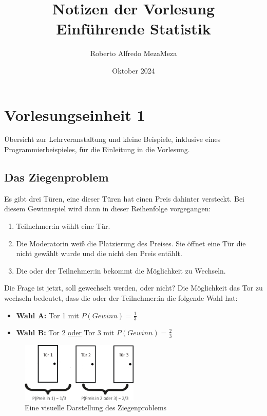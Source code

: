 \documentclass[12pt, a4paper]{article}
\title{Notizen der Vorlesung\\Einführende Statistik}
\author{Roberto Alfredo MezaMeza }
\date{Oktober 2024}
\begin{document}
\sloppy

\maketitle
\newpage

\section{Vorlesungseinheit 1}
    Übersicht zur Lehrveranstaltung und kleine Beispiele, inklusive eines Programmierbeispieles, für die Einleitung
    in die Vorlesung.

    \subsection{Das Ziegenproblem}
        Es gibt drei Türen, eine dieser Türen hat einen Preis dahinter versteckt. Bei diesem Gewinnspiel
        wird dann in dieser Reihenfolge vorgegangen:

        \begin{enumerate}
            \item Teilnehmer:in wählt eine Tür.
            \item Die Moderatorin weiß die Platzierung des Preises. Sie öffnet eine Tür die nicht gewählt wurde und die nicht den Preis entählt.
            \item Die oder der Teilnehmer:in bekommt die Möglichkeit zu Wechseln.
        \end{enumerate}

        Die Frage ist jetzt, soll gewechselt werden, oder nicht? Die Möglichkeit das Tor zu wechseln bedeutet, dass
        die oder der Teilnehmer:in die folgende Wahl hat:

        \begin{itemize}
            \item \textbf{Wahl A:} Tor 1 mit $P(Gewinn)=\frac{1}{3}$
            \item \textbf{Wahl B:} Tor 2 \underline{oder} Tor 3 mit $P(Gewinn)=\frac{2}{3}$
        \end{itemize}

        \begin{figure}[h]
            \centering
            \includegraphics[width=0.5\textwidth]{monty-hall-problem_example}
            \caption{Eine visuelle Darstellung des Ziegenproblems}
        \end{figure}
\end{document}

